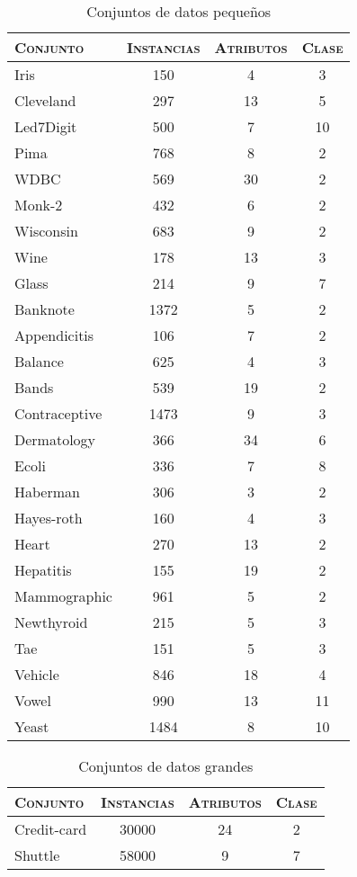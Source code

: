 \newpage

\begin{table}[]
\centering
\begin{tabular}{l c c c}
\hline
\textsc{Conjunto} & \textsc{Instancias} & \textsc{Atributos} & \textsc{Clase} \\
\hline
\hline

Iris          & 150  &  4 &  3 \\
Cleveland     & 297  & 13 &  5 \\
Led7Digit     & 500  &  7 & 10 \\
Pima          & 768  &  8 &  2 \\
WDBC          & 569  & 30 &  2 \\
Monk-2        & 432  &  6 &  2 \\
Wisconsin     & 683  &  9 &  2 \\
Wine          & 178  & 13 &  3 \\
Glass         & 214  &  9 &  7 \\
Banknote      & 1372 &  5 &  2 \\
Appendicitis  & 106  &  7 &  2 \\
Balance       & 625  &  4 &  3 \\
Bands         & 539  & 19 &  2 \\
Contraceptive & 1473 & 9  &  3 \\
Dermatology   &  366 & 34 &  6 \\
Ecoli         &  336 &  7 &  8 \\
Haberman      &  306 & 3  &  2 \\
Hayes-roth    &  160 & 4  &  3 \\
Heart         &  270 & 13 &  2 \\
Hepatitis     &  155 & 19 &  2 \\
Mammographic  &  961 & 5  &  2 \\
Newthyroid    &  215 & 5  &  3 \\
Tae           &  151 & 5  &  3 \\
Vehicle       &  846 & 18 &  4 \\
Vowel         &  990 & 13 & 11 \\
Yeast         & 1484 & 8  & 10 \\
 
\hline
\end{tabular}
\caption{Conjuntos de datos pequeños}
\label{pequenios}
\end{table}

\begin{table}[]
\centering
\begin{tabular}{l c c c}
\hline
\textsc{Conjunto} & \textsc{Instancias} & \textsc{Atributos} & \textsc{Clase} \\
\hline
\hline

Credit-card      & 30000 & 24 & 2 \\
Shuttle          & 58000 & 9  & 7 \\

\hline
\end{tabular}
\caption{Conjuntos de datos grandes}
\label{grandes}
\end{table}


